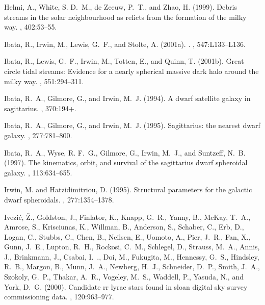 \begin{thebibliography}{}
{Helmi}, A., {White}, S. D.~M., {de Zeeuw}, P.~T., and {Zhao}, H. (1999).
\newblock Debris streams in the solar neighbourhood as relicts from the
  formation of the milky way.
\newblock {\em \nat}, 402:53--55.

{Ibata}, R., {Irwin}, M., {Lewis}, G.~F., and {Stolte}, A. (2001a).
.
\newblock {\em \apjl}, 547:L133--L136.

{Ibata}, R., {Lewis}, G.~F., {Irwin}, M., {Totten}, E., and {Quinn}, T.
  (2001b).
\newblock Great circle tidal streams: Evidence for a nearly spherical massive
  dark halo around the milky way.
\newblock {\em \apj}, 551:294--311.

{Ibata}, R.~A., {Gilmore}, G., and {Irwin}, M.~J. (1994).
\newblock A dwarf satellite galaxy in sagittarius.
\newblock {\em \nat}, 370:194+.

{Ibata}, R.~A., {Gilmore}, G., and {Irwin}, M.~J. (1995).
\newblock Sagittarius: the nearest dwarf galaxy.
\newblock {\em \mnras}, 277:781--800.

{Ibata}, R.~A., {Wyse}, R. F.~G., {Gilmore}, G., {Irwin}, M.~J., and
  {Suntzeff}, N.~B. (1997).
\newblock The kinematics, orbit, and survival of the sagittarius dwarf
  spheroidal galaxy.
\newblock {\em \aj}, 113:634--655.

{Irwin}, M. and {Hatzidimitriou}, D. (1995).
\newblock Structural parameters for the galactic dwarf spheroidals.
\newblock {\em \mnras}, 277:1354--1378.

{Ivezi{\' c}}, {\v Z}., {Goldston}, J., {Finlator}, K., {Knapp}, G.~R.,
  {Yanny}, B., {McKay}, T.~A., {Amrose}, S., {Krisciunas}, K., {Willman}, B.,
  {Anderson}, S., {Schaber}, C., {Erb}, D., {Logan}, C., {Stubbs}, C., {Chen},
  B., {Neilsen}, E., {Uomoto}, A., {Pier}, J.~R., {Fan}, X., {Gunn}, J.~E.,
  {Lupton}, R.~H., {Rockosi}, C.~M., {Schlegel}, D., {Strauss}, M.~A., {Annis},
  J., {Brinkmann}, J., {Csabai}, I.~., {Doi}, M., {Fukugita}, M., {Hennessy},
  G.~S., {Hindsley}, R.~B., {Margon}, B., {Munn}, J.~A., {Newberg}, H.~J.,
  {Schneider}, D.~P., {Smith}, J.~A., {Szokoly}, G.~P., {Thakar}, A.~R.,
  {Vogeley}, M.~S., {Waddell}, P., {Yasuda}, N., and {York}, D.~G. (2000).
\newblock Candidate rr lyrae stars found in sloan digital sky survey
  commissioning data.
\newblock {\em \aj}, 120:963--977.


\end{thebibliography}
